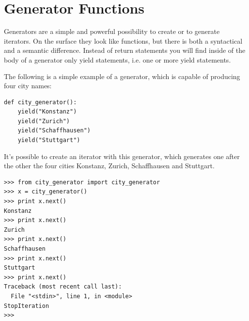 \section{Generator Functions }
Generators are a simple and powerful possibility to create or to generate iterators. On the surface they look like functions, but there is both a syntactical and a semantic difference. Instead of return statements you will find inside of the body of a generator only yield statements, i.e. one or more yield statements. 

The following is a simple example of a generator, which is capable of producing four city names:




\begin{verbatim}
def city_generator():
    yield("Konstanz")
    yield("Zurich")
    yield("Schaffhausen")
    yield("Stuttgart")
\end{verbatim}

 It's possible to create an iterator with this generator, which generates one after the other the four cities Konstanz, Zurich, Schaffhausen and Stuttgart. 

\begin{verbatim}
>>> from city_generator import city_generator
>>> x = city_generator()
>>> print x.next()
Konstanz
>>> print x.next()
Zurich
>>> print x.next()
Schaffhausen
>>> print x.next()
Stuttgart
>>> print x.next()
Traceback (most recent call last):
  File "<stdin>", line 1, in <module>
StopIteration
>>> 
\end{verbatim}

